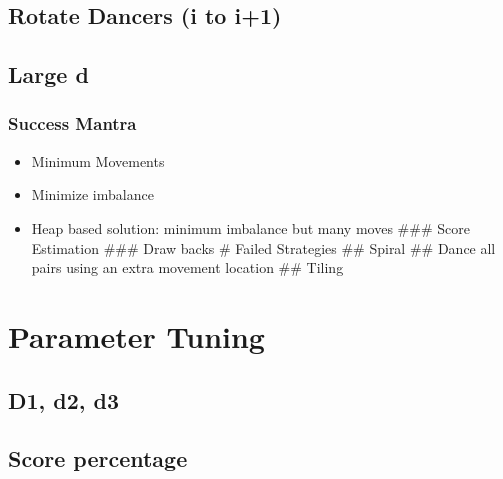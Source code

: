 \subsection{Rotate Dancers (i to i+1)}\label{rotate-dancers-i-to-i1}

\subsection{Large d}\label{large-d}

\subsubsection{Success Mantra}\label{success-mantra}

\begin{itemize}
\tightlist
\item
  Minimum Movements
\item
  Minimize imbalance
\item
  Heap based solution: minimum imbalance but many moves \#\#\# Score
  Estimation \#\#\# Draw backs \# Failed Strategies \#\# Spiral \#\#
  Dance all pairs using an extra movement location \#\# Tiling
\end{itemize}

\section{Parameter Tuning}\label{parameter-tuning}

\subsection{D1, d2, d3}\label{d1-d2-d3}

\subsection{Score percentage}\label{score-percentage}
